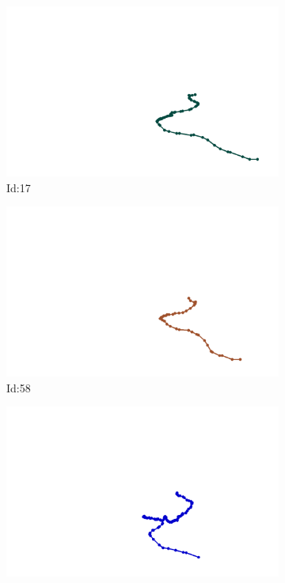 \documentclass[12pt,twoside]{report}
\begin{document}
\begin{figure}
\centering
\begin{subfigure}[b]{0.20\textwidth}
\centering
\includegraphics[width=\textwidth]{../trajectories/17.png}
\caption{Id:17}
\end{subfigure}
\begin{subfigure}[b]{0.20\textwidth}
\centering
\includegraphics[width=\textwidth]{../trajectories/58.png}
\caption{Id:58}
\end{subfigure}
\begin{subfigure}[b]{0.20\textwidth}
\centering
\includegraphics[width=\textwidth]{../trajectories/165.png}

\end{subfigure}
\end{figure}
\end{document}
